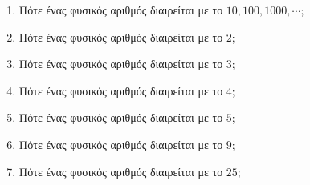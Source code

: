 \documentclass[a4paper,11pt]{report}
\begin{document}
\begin{enumerate}
\item Πότε ένας φυσικός αριθμός διαιρείται με το $10,100,1000,\cdots$;
\item Πότε ένας φυσικός αριθμός διαιρείται με το $2$;
\item Πότε ένας φυσικός αριθμός διαιρείται με το $3$;
\item Πότε ένας φυσικός αριθμός διαιρείται με το $4$;
\item Πότε ένας φυσικός αριθμός διαιρείται με το $5$;
\item Πότε ένας φυσικός αριθμός διαιρείται με το $9$;
\item Πότε ένας φυσικός αριθμός διαιρείται με το $25$;
\end{enumerate}
\end{document}
